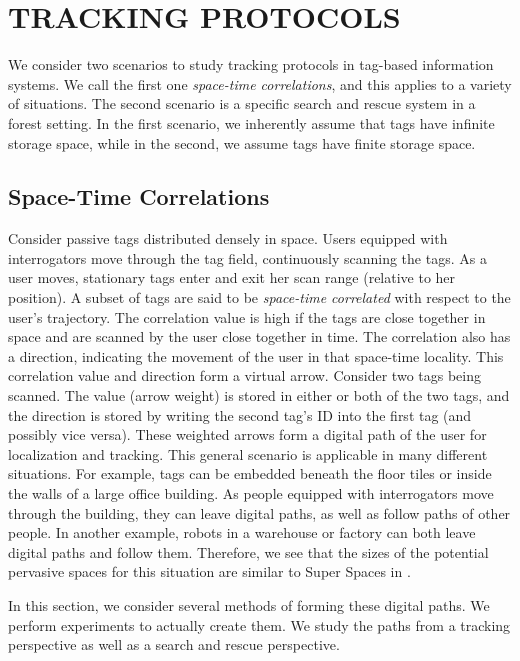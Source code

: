 \chapter{TRACKING PROTOCOLS}
\label{Section: Tracking Protocols}

We consider two scenarios to study tracking protocols in tag-based information systems. We call the first one \emph{space-time correlations}, and this applies to a variety of situations. The second scenario is a specific search and rescue system in a forest setting. In the first scenario, we inherently assume that tags have infinite storage space, while in the second, we assume tags have finite storage space.

\section{Space-Time Correlations}
\label{Section: Tracking Protocols: Space-time Correlations}
Consider passive tags distributed densely in space. Users equipped with interrogators move through the tag field, continuously scanning the tags.  As a user moves, stationary tags enter and exit her scan range (relative to her position).  A subset of tags are said to be \emph{space-time correlated} with respect to the user's trajectory.  The correlation value is high if the tags are close together in space and are scanned by the user close together in time.  The correlation also has a direction, indicating the movement of the user in that space-time locality.  This correlation value and direction form a virtual arrow. Consider two tags being scanned. The value (arrow weight) is stored in either or both of the two tags, and the direction is stored by writing the second tag's ID into the first tag (and possibly vice versa).  These weighted arrows form a digital path of the user for localization and tracking. This general scenario is applicable in many different situations. For example, tags can be embedded beneath the floor tiles or inside the walls of a large office building. As people equipped with interrogators move through the building, they can leave digital paths, as well as follow paths of other people. In another example, robots in a warehouse or factory can both leave digital paths and follow them. Therefore, we see that the sizes of the potential pervasive spaces for this situation are similar to Super Spaces in \cite{2004 Al-Muhtadi}.

In this section, we consider several methods of forming these digital paths. We perform experiments to actually create them. We study the paths from a tracking perspective as well as a search and rescue perspective.

